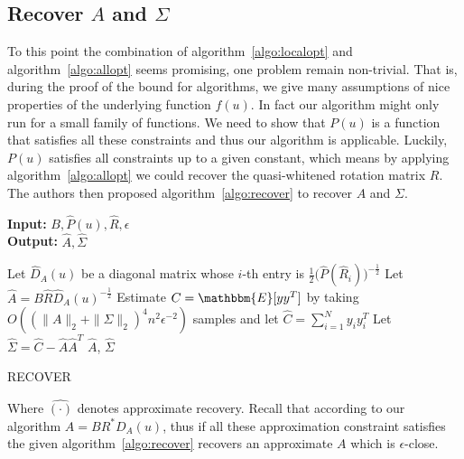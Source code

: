 \subsection{Recover $A$ and $\Sigma$}
To this point the combination of algorithm~\ref{algo:localopt} and
algorithm~\ref{algo:allopt} seems promising, one problem remain
non-trivial. That is, during the proof of the bound for algorithms,
we give many assumptions of nice properties of the underlying
function $f(u)$. In fact our algorithm might only run for a small
family of functions. We need to show that $P(u)$ is a function that
satisfies all these constraints and thus our algorithm is applicable.
Luckily, $P(u)$ satisfies all constraints up to a given constant,
which means by applying algorithm~\ref{algo:allopt} we could recover
the quasi-whitened rotation matrix $R$. The authors then proposed
algorithm~\ref{algo:recover} to recover $A$ and $\Sigma$.

\begin{algorithm}[t]
\hspace*{\algorithmicindent} \textbf{Input:} $B, \hat{P}(u), \hat{R}, \epsilon$\\
\hspace*{\algorithmicindent} \textbf{Output:} $\hat{A}, \hat{\Sigma}$

\begin{algorithmic}
    \STATE Let $\hat{D}_A(u)$ be a diagonal matrix whose $i$-th entry
    is $\frac{1}{2}\big(\hat{P}(\hat{R}_i)\big)^{-\frac{1}{2}}$
    \STATE Let $\hat{A} = B\hat{R}\hat{D}_A(u)^{-\frac{1}{2}}$
    \STATE Estimate $C =
    \mathbbm{E}[yy^T]$ by taking $O((\|A\|_2 +
    \|\Sigma\|_2)^4n^2\epsilon^{-2})$ samples and let $\hat{C} =
    \sum_{i = 1}^Ny_iy_i^T$
    \STATE Let $\hat{\Sigma} = \hat{C} - \hat{A}\hat{A}^T$
    \RETURN $\hat{A}$, $\hat{\Sigma}$
\end{algorithmic}
\caption{RECOVER}
\label{algo:recover}
\end{algorithm}

Where $\hat{(\cdot)}$ denotes approximate recovery. Recall that
according to our algorithm $A = BR^*D_A(u)$, thus if all these
approximation constraint satisfies the given
algorithm~\ref{algo:recover} recovers an approximate $A$ which is
$\epsilon$-close.